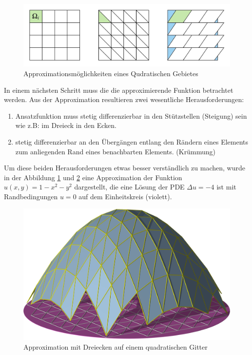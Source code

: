 \begin{figure}[h!]
	\centering
	\includegraphics[scale=0.6]{papers/fem/Images/Figuren.jpeg}
	\caption{Approximationsmöglichkeiten eines Qudratischen Gebietes}
	\label{fig:Figuren}
\end{figure}

In einem nächsten Schritt muss die die approximierende Funktion betrachtet werden. Aus der Approximation resultieren zwei wesentliche Herausforderungen:
\begin{enumerate}
	\item Ansatzfunktion muss stetig differenzierbar in den Stützstellen (Steigung) sein wie z.B: im Dreieck in den Ecken.
	\item stetig differenzierbar an den Übergängen entlang den Rändern eines Elements zum anliegenden Rand eines benachbarten Elements. (Krümmung)
\end{enumerate}
Um diese beiden Herausforderungen etwas besser verständlich zu machen, wurde in der Abbildung \ref{fig:Figuren} und \ref{fig:Ansatz} eine Approximation der Funktion   $u(x,y) = 1-x^2-y^2$ dargestellt, die eine Lösung der PDE $\Delta u = -4$ ist mit Randbedingungen $u=0$ auf dem Einheitskreis (violett).
\begin{figure}[h]
	\centering
	\includegraphics[scale=0.8]{papers/fem/Images/ansatz.jpg}
	\caption{Approximation mit Dreiecken auf einem quadratischen Gitter }
	\label{fig:Ansatz}
\end{figure}
